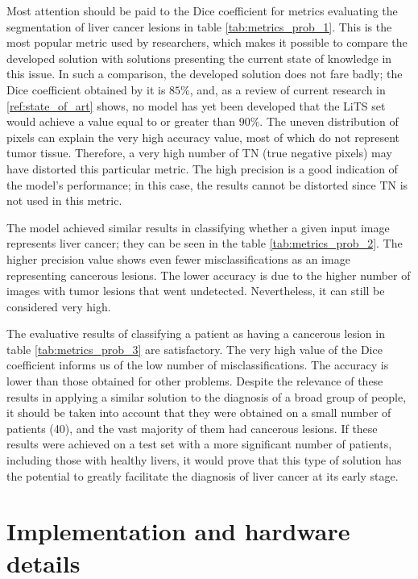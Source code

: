 Most attention should be paid to the Dice coefficient for metrics evaluating the segmentation of liver cancer lesions in table \ref{tab:metrics_prob_1}. This is the most popular metric used by researchers, which makes it possible to compare the developed solution with solutions presenting the current state of knowledge in this issue. In such a comparison, the developed solution does not fare badly; the Dice coefficient obtained by it is $85\%$, and, as a review of current research in \ref{ref:state_of_art} shows, no model has yet been developed that the LiTS set would achieve a value equal to or greater than $90\%$. The uneven distribution of pixels can explain the very high accuracy value, most of which do not represent tumor tissue. Therefore, a very high number of TN (true negative pixels) may have distorted this particular metric. The high precision is a good indication of the model's performance; in this case, the results cannot be distorted since TN is not used in this metric. 

The model achieved similar results in classifying whether a given input image represents liver cancer; they can be seen in the table \ref{tab:metrics_prob_2}. The higher precision value shows even fewer misclassifications as an image representing cancerous lesions. The lower accuracy is due to the higher number of images with tumor lesions that went undetected. Nevertheless, it can still be considered very high.

The evaluative results of classifying a patient as having a cancerous lesion in table \ref{tab:metrics_prob_3} are satisfactory. The very high value of the Dice coefficient informs us of the low number of misclassifications. The accuracy is lower than those obtained for other problems. Despite the relevance of these results in applying a similar solution to the diagnosis of a broad group of people, it should be taken into account that they were obtained on a small number of patients (40), and the vast majority of them had cancerous lesions. If these results were achieved on a test set with a more significant number of patients, including those with healthy livers, it would prove that this type of solution has the potential to greatly facilitate the diagnosis of liver cancer at its early stage.




\section{Implementation and hardware details}


